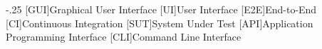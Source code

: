 
\begin{acronym}
    \itemsep-.25\baselineskip
    [GUI]{Graphical User Interface}
    [UI]{User Interface}
    [E2E]{End-to-End}
    [CI]{Continuous Integration}
    [SUT]{System Under Test}
    [API]{Application Programming Interface}
    [CLI]{Command Line Interface}
\end{acronym}
